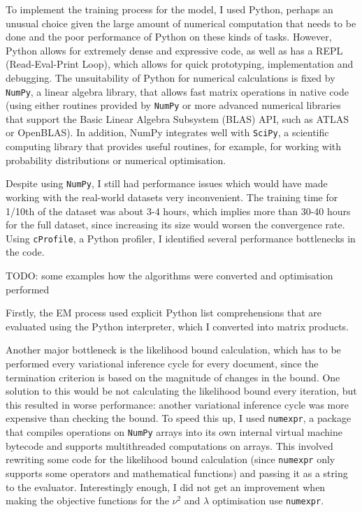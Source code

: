 \documentclass[12pt,a4paper,twoside,openright]{report}
\begin{document}
To implement the training process for the model, I used Python, perhaps an unusual choice given the large amount of numerical computation that needs to be done and the poor performance of Python on these kinds of tasks. However, Python allows for extremely dense and expressive code, as well as has a REPL (Read-Eval-Print Loop), which allows for quick prototyping, implementation and debugging. The unsuitability of Python for numerical calculations is fixed by \texttt{NumPy}\cite{DBLP:journals/corr/abs-1102-1523}, a linear algebra library, that allows fast matrix operations in native code (using either routines provided by \texttt{NumPy} or more advanced numerical libraries that support the Basic Linear Algebra Subsystem (BLAS) API, such as ATLAS or OpenBLAS). In addition, NumPy integrates well with \texttt{SciPy}, a scientific computing library that provides useful routines, for example, for working with probability distributions or numerical optimisation.

Despite using \texttt{NumPy}, I still had performance issues which would have made working with the real-world datasets very inconvenient. The training time for 1/10th of the dataset was about 3-4 hours, which implies more than 30-40 hours for the full dataset, since increasing its size would worsen the convergence rate. Using \texttt{cProfile}, a Python profiler, I identified several performance bottlenecks in the code.

TODO: some examples how the algorithms were converted and optimisation performed

Firstly, the EM process used explicit Python list comprehensions that are evaluated using the Python interpreter, which I converted into matrix products.

Another major bottleneck is the likelihood bound calculation, which has to be performed every variational inference cycle for every document, since the termination criterion is based on the magnitude of changes in the bound. One solution to this would be not calculating the likelihood bound every iteration, but this resulted in worse performance: another variational inference cycle was more expensive than checking the bound. To speed this up, I used \texttt{numexpr}, a package that compiles operations on \texttt{NumPy} arrays into its own internal virtual machine bytecode and supports multithreaded computations on arrays. This involved rewriting some code for the likelihood bound calculation (since \texttt{numexpr} only supports some operators and mathematical functions) and passing it as a string to the evaluator. Interestingly enough, I did not get an improvement when making the objective functions for the $\nu^2$ and $\lambda$ optimisation use \texttt{numexpr}.
\end{document}

